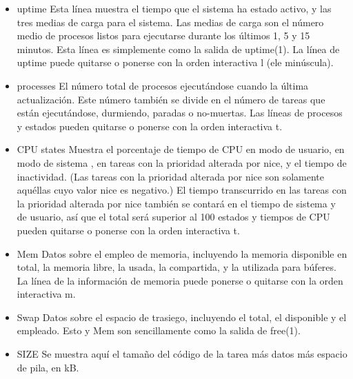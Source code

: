\documentclass[12pt]{article}
\begin{document}
\begin{itemize}
\item       uptime
            Esta línea muestra el tiempo que el sistema ha  estado  activo,  y
            las  tres medias de carga para el sistema. Las medias de carga son
            el número medio de procesos listos  para  ejecutarse  durante  los
            últimos  1,  5  y  15  minutos.  Esta línea es simplemente como la
            salida de uptime(1).  La línea de uptime puede quitarse o  ponerse
            con la orden interactiva l (ele minúscula).

\item       processes
            El   número  total  de  procesos  ejecutándose  cuando  la  última
            actualización. Este número también  se  divide  en  el  número  de
            tareas  que  están  ejecutándose, durmiendo, paradas o no-muertas.
            Las líneas de procesos y estados pueden quitarse o ponerse con  la
            orden interactiva t.

\item       CPU states
            Muestra el porcentaje de tiempo de CPU en modo de usuario, en modo
            de sistema , en tareas con la prioridad alterada por  nice,  y  el
            tiempo  de  inactividad. (Las tareas con la prioridad alterada por
            nice son solamente aquéllas cuyo  valor  nice  es  negativo.)   El
            tiempo  transcurrido  en  las tareas con la prioridad alterada por
            nice también se contará en el tiempo de sistema y de usuario,  así
            que  el  total  será  superior  al  100%
            estados y tiempos de CPU pueden quitarse o ponerse  con  la  orden
            interactiva t.

\item       Mem  Datos sobre el empleo de memoria, incluyendo la memoria disponible
            en total,  la  memoria  libre,  la  usada,  la  compartida,  y  la
            utilizada  para  búferes.  La  línea  de la información de memoria
            puede ponerse o quitarse con la orden interactiva m.

\item       Swap Datos sobre el  espacio  de  trasiego,  incluyendo  el  total,  el
            disponible  y  el  empleado.  Esto y Mem son sencillamente como la
            salida de free(1).


\item       SIZE Se  muestra  aquí  el  tamaño del código de la tarea más datos más
            espacio de pila, en kB.



\end{itemize}
\end{document}
